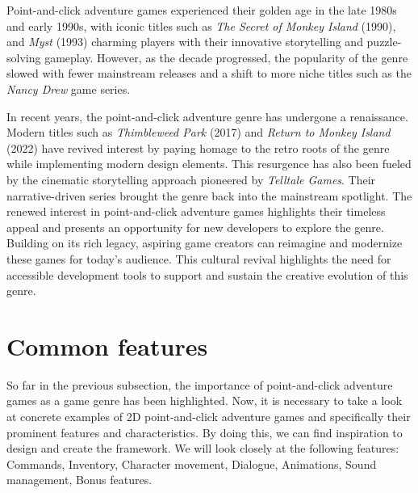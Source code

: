 Point-and-click adventure games experienced their golden age in the late 1980s and early 1990s, with iconic titles such as \textit{The Secret of Monkey Island} (1990), and \textit{Myst} (1993) charming players with their innovative storytelling and puzzle-solving gameplay. However, as the decade progressed, the popularity of the genre slowed \cite{Qaffas202022} with fewer mainstream releases and a shift to more niche titles such as the \textit{Nancy Drew} game series.

In recent years, the point-and-click adventure genre has undergone a renaissance. Modern titles such as \textit{Thimbleweed Park} (2017) and \textit{Return to Monkey Island} (2022) have revived interest by paying homage to the retro roots of the genre while implementing modern design elements. This resurgence has also been fueled by the cinematic storytelling approach pioneered by \textit{Telltale Games}. Their narrative-driven series brought the genre back into the mainstream spotlight. The renewed interest in point-and-click adventure games highlights their timeless appeal and presents an opportunity for new developers to explore the genre. Building on its rich legacy, aspiring game creators can reimagine and modernize these games for today's audience. This cultural revival highlights the need for accessible development tools to support and sustain the creative evolution of this genre.

\section{Common features}
\label{sec:Common features}
So far in the previous subsection, the importance of point-and-click adventure games as a game genre has been highlighted. Now, it is necessary to take a look at concrete examples of 2D point-and-click adventure games and specifically their prominent features and characteristics. By doing this, we can find inspiration to design and create the framework. We will look closely at the following features: Commands, Inventory, Character movement, Dialogue, Animations, Sound management, Bonus features.

